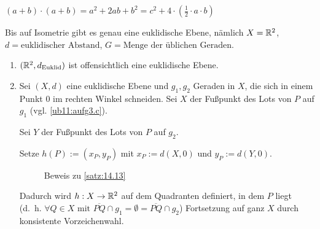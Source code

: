 \begin{beweis}
    $(a+b) \cdot (a+b) = a^2 + 2ab + b^2 = c^2 +4 \cdot (\frac{1}{2} \cdot a \cdot b)$
\end{beweis}

\begin{satz}\label{satz:14.13} %
    Bis auf Isometrie gibt es genau eine euklidische Ebene, nämlich
    $X=\mathbb{R}^2$, $d = \text{euklidischer Abstand}$, $G = \text{Menge der üblichen Geraden}$.
\end{satz}

\begin{beweis}\leavevmode
    \begin{enumerate}[label=(\roman*)]
        \item $(\mathbb{R}^2, d_\text{Euklid})$ ist offensichtlich eine euklidische Ebene.
        \item Sei $(X,d)$ eine euklidische Ebene und $g_1, g_2$ Geraden
              in $X$, die sich in einem Punkt $0$ im rechten Winkel
              schneiden. Sei $X$ der Fußpunkt des Lots von $P$ auf
              $g_1$ (vgl. \cref{ub11:aufg3.c}).

              Sei $Y$ der Fußpunkt des Lots von $P$ auf $g_2$.

              Setze $h(P) := (x_P, y_P)$ mit 
              $x_P := d(X, 0)$ und $y_P := d(Y, 0)$.

            \begin{figure}[ht]
                \centering
                \subfloat[Schritt 1]{
                    \resizebox{0.45\linewidth}{!}{}
                    \label{fig:14.13.1}
                }%
                \subfloat[Schritt 2]{
                    \resizebox{0.45\linewidth}{!}{}
                    \label{fig:14.13.2}
                }%
                \label{fig:14.13.0.1}
                \caption{Beweis zu \cref{satz:14.13}}
            \end{figure}

            Dadurch wird $h:X \rightarrow \mathbb{R}^2$ auf dem Quadranten
            definiert, in dem $P$ liegt (d.~h. $\forall Q \in X \text{ mit } \overline{PQ} \cap g_1 = \emptyset = \overline{PQ} \cap g_2$)
            Fortsetzung auf ganz $X$ durch konsistente Vorzeichenwahl.


\end{enumerate}
\end{beweis}
